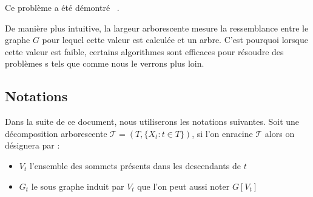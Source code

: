 \begin{nrmq}
    Ce problème a été démontré \npc~\cite{Arn87}.
\end{nrmq}

De manière plus intuitive, la largeur arborescente mesure la ressemblance entre le graphe $G$ pour
lequel cette valeur est calculée et un arbre. C'est pourquoi lorsque cette valeur est faible,
certains algorithmes sont efficaces pour résoudre des problèmes \npc s tels que \hcycle comme nous
le verrons plus loin.

\subsection*{Notations}

Dans la suite de ce document, nous utiliserons les notations suivantes. Soit une décomposition
arborescente $\mathcal{T} = (T, \{X_t : t \in T\})$, si l'on enracine $\mathcal{T}$ alors on désignera par :
\begin{itemize}
    \item $V_t$ l'ensemble des sommets présents dans les descendants de $t$
    \item $G_t$ le sous graphe induit par $V_t$ que l'on peut aussi noter $G[V_t]$
\end{itemize}


